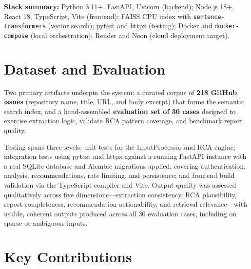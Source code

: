 \documentclass[12pt,a4paper]{article}
\begin{document}
\smallskip
\noindent\textbf{Stack summary:} Python 3.11+, FastAPI, Uvicorn (backend); Node.js 18+, React 18, TypeScript, Vite (frontend); FAISS CPU index with \texttt{sentence-transformers} (vector search); pytest and httpx (testing); Docker and \texttt{docker-compose} (local orchestration); Render and Neon (cloud deployment target).

\section{Dataset and Evaluation}

Two primary artifacts underpin the system: a curated corpus of \textbf{218 GitHub issues} (repository name, title, URL, and body excerpt) that forms the semantic search index, and a hand-assembled \textbf{evaluation set of 30 cases} designed to exercise extraction logic, validate RCA pattern coverage, and benchmark report quality.

Testing spans three levels: unit tests for the InputProcessor and RCA engine; integration tests using pytest and httpx against a running FastAPI instance with a real SQLite database and Alembic migrations applied, covering authentication, analysis, recommendations, rate limiting, and persistence; and frontend build validation via the TypeScript compiler and Vite. Output quality was assessed qualitatively across five dimensions---extraction consistency, RCA plausibility, report completeness, recommendation actionability, and retrieval relevance---with usable, coherent outputs produced across all 30 evaluation cases, including on sparse or ambiguous inputs.

\section{Key Contributions}
\end{document}
